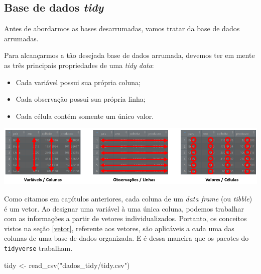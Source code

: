 \documentclass[
  brazilian,
]{book}
\newenvironment{Shaded}{\begin{snugshade}}{\end{snugshade}}
\newcommand{\FunctionTok}[1]{\textcolor[rgb]{0.00,0.00,0.00}{#1}}
\newcommand{\NormalTok}[1]{#1}
\newcommand{\OtherTok}[1]{\textcolor[rgb]{0.56,0.35,0.01}{#1}}
\newcommand{\StringTok}[1]{\textcolor[rgb]{0.31,0.60,0.02}{#1}}
\let\origfigure\figure
\let\endorigfigure\endfigure
\renewenvironment{figure}[1][2] {
    \expandafter\origfigure\expandafter[H]
} {
    \endorigfigure
}
\begin{document}
\hypertarget{base-de-dados-tidy}{%
\subsection{\texorpdfstring{Base de dados \emph{tidy}}{Base de dados tidy}}\label{base-de-dados-tidy}}

Antes de abordarmos as bases desarrumadas, vamos tratar da base de dados arrumadas.

Para alcançarmos a tão desejada base de dados arrumada, devemos ter em mente as três principais propriedades de uma \emph{tidy data}:

\begin{itemize}
\item
  Cada variável possui sua própria coluna;
\item
  Cada observação possui sua própria linha;
\item
  Cada célula contém somente um único valor.
\end{itemize}

\begin{figure}

{\centering \includegraphics[width=0.9\linewidth]{imagens/tidy_data} 

}

\caption{Seguindo os princípios da tidy data, cada variável possui uma coluna, cada observação está em uma linha e cada célula contém somente um valor.}\label{fig:unnamed-chunk-115}
\end{figure}

Como citamos em capítulos anteriores, cada coluna de um \emph{data frame} (ou \emph{tibble}) é um vetor. Ao designar uma variável à uma única coluna, podemos trabalhar com as informações a partir de vetores individualizados. Portanto, os conceitos vistos na seção \ref{vetor}, referente aos vetores, são aplicáveis a cada uma das colunas de uma base de dados organizada. E é dessa maneira que os pacotes do \texttt{tidyverse} trabalham.

\begin{Shaded}
\begin{Highlighting}[]
\NormalTok{tidy }\OtherTok{\textless{}{-}} \FunctionTok{read\_csv}\NormalTok{(}\StringTok{"dados\_tidy/tidy.csv"}\NormalTok{)}
\end{Highlighting}
\end{Shaded}
\end{document}
